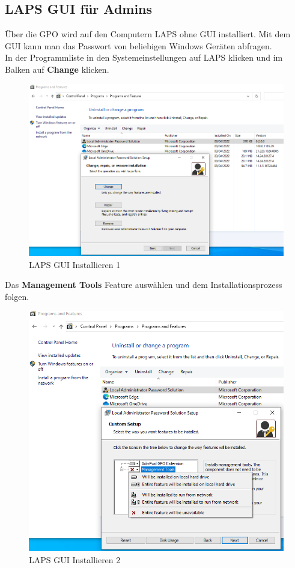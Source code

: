\subsection{LAPS GUI für Admins}
Über die GPO wird auf den Computern LAPS ohne GUI installiert.
Mit dem GUI kann man das Passwort von beliebigen Windows Geräten abfragen.\\

In der Programmliste in den Systemeinstellungen auf LAPS klicken und im Balken auf \textbf{Change} klicken.
\begin{figure}[H]
    \centering
    \includegraphics[width=0.7\linewidth]{../img/LAPS/laps-ui-install.png}
    \caption{LAPS GUI Installieren 1}
\end{figure}

Das \textbf{Management Tools} Feature auswählen und dem Installationsprozess folgen.
\begin{figure}[H]
    \centering
    \includegraphics[width=0.7\linewidth]{../img/LAPS/laps-ui-install-2.png}
    \caption{LAPS GUI Installieren 2}
\end{figure}


